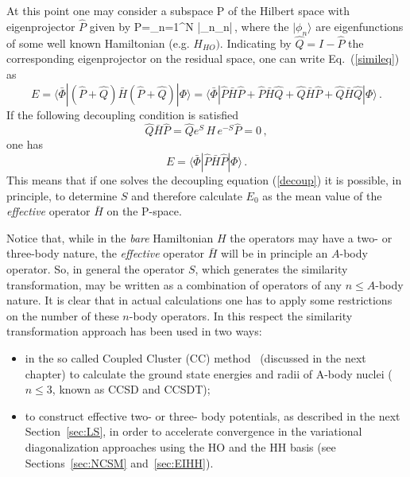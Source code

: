 At this point one may consider a subspace P of the  Hilbert space  with  eigenprojector $\hat P$ given by 
\be
\hat P=\sum_{n=1}^N |\phi_n\rangle\langle\phi_n|\,, 
\ee 
where the $|\phi_n\rangle$ are eigenfunctions of some well known Hamiltonian (e.g. $H_{HO})$.
Indicating by $\hat Q=I-\hat P$ the corresponding eigenprojector on the  residual space, one can write Eq.~(\ref{simileq})
as 
\begin{equation}
E=\langle \bar\Phi|(\hat P + \hat Q){\bar H}(\hat P + \hat Q) |\Phi\rangle =
\langle \bar\Phi|\hat P{\bar H}\hat P+\hat P{\bar H}\hat Q+\hat Q{\bar H}\hat P+\hat Q{\bar H}\hat Q|\Phi\rangle\,.
\end{equation}
If  the following decoupling condition is satisfied
\begin{equation}
 \hat Q{\bar H}\hat P = \hat Q e^{S}\, H\,e^{-S}\hat P = 0\,,
\label{decoup}
\end{equation}
one has
\begin{equation}
E=\langle \bar\Phi|\hat P{\bar H}\hat P|\Phi\rangle\,.
\end{equation} 
This means that if one solves the decoupling equation (\ref{decoup}) it is possible, in principle, to determine $S$ and therefore
calculate $E_0$ as the mean value of the {\it effective} operator ${\bar H}$ on the P-space.  

Notice that, while in the {\it bare} Hamiltonian $H$ the operators may have  a two- or three-body nature, the  
{\it effective} operator ${\bar H}$ will be in principle an $A$-body operator. So, in general the operator $S$, 
which generates the similarity transformation, may be written as a combination of operators of any $n\leq A$-body nature. 
It is clear that in actual calculations one has to apply some restrictions on the number of these $n$-body
operators. In this respect the similarity transformation approach has been used in two ways: 
\begin{itemize}
 \item  in the so called Coupled Cluster (CC) method~\cite{Zab:1978,HJ:2004}  (discussed in the next chapter) 
 to calculate the ground state energies and radii of A-body nuclei ($n\leq 3$, known as CCSD and CCSDT);
 \item to construct effective two- or three- body potentials, as described in the next Section~\ref{sec:LS},
 in order to accelerate convergence in the variational diagonalization approaches using the  HO  
and the HH basis (see Sections~\ref{sec:NCSM} and~\ref{sec:EIHH}).
\end{itemize}


